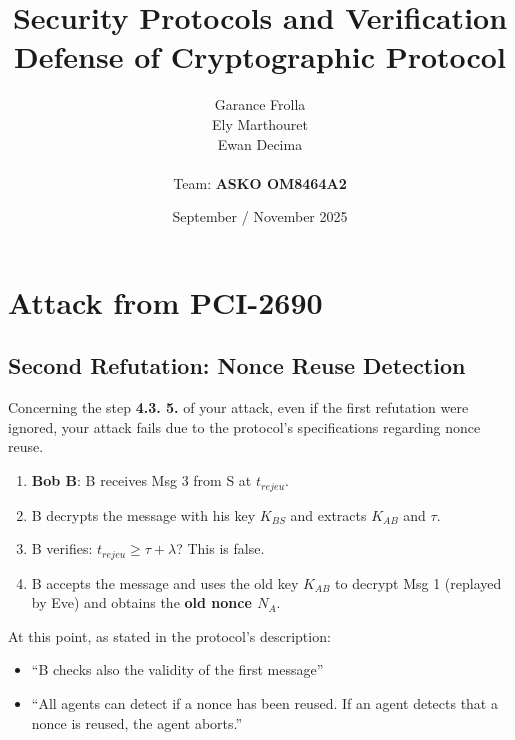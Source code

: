 \documentclass[11pt]{article}
\begin{document}
    \title{
        { \textbf{Security Protocols and Verification}} \\[1ex]
        {\small Defense of Cryptographic Protocol}
    }


    \author{
        Garance Frolla \\
        Ely Marthouret \\
        Ewan Decima\\ \\
        Team: \textbf{ASKO OM8464A2}
    }

    \date{September / November 2025}


    \maketitle
    \tableofcontents
    \newpage

    \section{Attack from PCI-2690}
    
    \subsection{Second Refutation: Nonce Reuse Detection}

    Concerning the step \textbf{4.3. 5.} of your attack, even if the first refutation were ignored, your attack fails due to the protocol's specifications regarding nonce reuse.
    
    \begin{enumerate}[label=\arabic*., start=5]
        \item \textbf{Bob B}: B receives Msg 3 from S at $t_{rejeu}$.
        \item B decrypts the message with his key $K_{BS}$ and extracts $K_{AB}$ and $\tau$.
        \item B verifies: $t_{rejeu} \geq \tau + \lambda$? This is false.
        \item B accepts the message and uses the old key $K_{AB}$ to decrypt Msg 1 (replayed by Eve) and obtains the \textbf{old nonce $N_A$}.
    \end{enumerate}

    At this point, as stated in the protocol's description:
    \begin{itemize}
        \item \enquote{B checks also the validity of the first message}
        \item \enquote{All agents can detect if a nonce has been reused. If an agent detects that a nonce is reused, the agent aborts.}
    \end{itemize}
    
\end{document}
